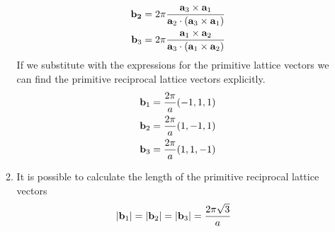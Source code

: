 \documentclass[12pt,a4paper]{article}
\begin{document}
\begin{enumerate}
\begin{enumerate}
\begin{align*}
				\vb{b_2} = 2\pi \frac{\vb{a}_3\times \vb{a}_1}{\vb{a}_2\cdot (\vb{a}_3\times\vb{a}_1)}\\
				\vb{b}_3 = 2\pi \frac{\vb{a}_1\times \vb{a}_2}{\vb{a}_3\cdot (\vb{a}_1\times\vb{a}_2)}
			\end{align*}
			If we substitute with the expressions for the primitive lattice vectors we can find the primitive reciprocal lattice vectors explicitly.
			\begin{align*}
				\vb{b}_1 = \frac{2\pi}{a}(-1,1,1)\\
				\vb{b}_2 = \frac{2\pi}{a}(1,-1,1)\\
				\vb{b}_3 = \frac{2\pi}{a}(1,1,-1)
			\end{align*}
			\item It is possible to calculate the length of the primitive reciprocal lattice vectors
			\begin{align*}
				\abs{\vb{b}_1} &= \abs{\vb{b}_2} = \abs{\vb{b}_3} = \frac{2\pi\sqrt{3}}{a}
			\end{align*}
		\end{enumerate}
		

\end{enumerate}
\end{document}
